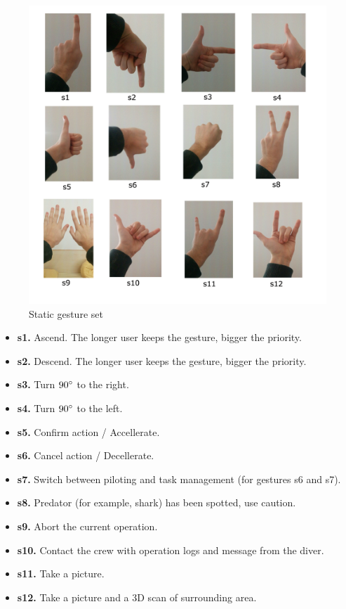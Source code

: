 \documentclass[a4paper,11pt,oneside]{article}
\begin{document}
  \begin{figure}[H]
  \centering
  \includegraphics[scale=0.4]{static-gestureset.png}
  \caption{Static gesture set}
  \end{figure}
    
    \begin{itemize}
    \item \textbf{s1.} Ascend. The longer user keeps the gesture, bigger the priority.
    \item \textbf{s2.} Descend. The longer user keeps the gesture, bigger the priority.
    \item \textbf{s3.} Turn $90\degree$ to the right.
    \item \textbf{s4.} Turn $90\degree$ to the left.
    \item \textbf{s5.} Confirm action / Accellerate.
    \item \textbf{s6.} Cancel action / Decellerate.
    \item \textbf{s7.} Switch between piloting and task management (for gestures s6 and s7).
    \item \textbf{s8.} Predator (for example, shark) has been spotted, use caution.
    \item \textbf{s9.} Abort the current operation.
    \item \textbf{s10.} Contact the crew with operation logs and message from the diver.
    \item \textbf{s11.} Take a picture.
    \item \textbf{s12.} Take a picture and a 3D scan of surrounding area.
    \end{itemize}
    
\end{document}
